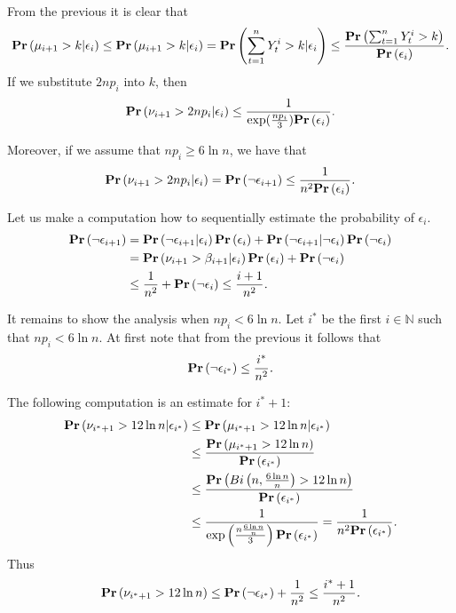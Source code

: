 From the previous it is clear that 
\[
\mathbf{Pr}\left(\mu_{i + 1} > k | \epsilon_i\right) \leq \mathbf{Pr}\left(\mu_{i + 1} > k | \epsilon_i\right) = \mathbf{Pr}\left(\displaystyle\sum_{t = 1}^{n} Y_t^{i} > k | \epsilon_i\right) \leq \frac{\mathbf{Pr}\left(\sum_{t = 1}^{n} Y_t^{i} > k\right)}{\mathbf{Pr}\left(\epsilon_i\right)}\textit{.}
\]
If we substitute $2np_i$ into $k$, then
\[
\mathbf{Pr}\left(\nu_{i + 1} > 2np_i | \epsilon_i\right) \leq \frac{1}{\exp(\frac{np_i}{3})\mathbf{Pr}\left(\epsilon_i\right)} \text{.}
\]

Moreover, if we assume that $np_i \geq 6 \ln n$, we have that 
\[
\mathbf{Pr}\left(\nu_{i + 1} > 2np_i | \epsilon_i\right) = \mathbf{Pr}\left(\neg \epsilon_{i + 1}\right) \leq \frac{1}{n ^ 2\mathbf{Pr}\left(\epsilon_i\right)} \textit{.}
\]

Let us make a computation how to sequentially estimate the probability of $\epsilon_i$.
\[
\begin{split}
\mathbf{Pr}\left(\neg \epsilon_{i + 1}\right) 
	& = \mathbf{Pr}\left(\neg \epsilon_{i + 1} | \epsilon_i\right)\mathbf{Pr}\left(\epsilon_i\right) + \mathbf{Pr}\left(\neg \epsilon_{i + 1} | \neg \epsilon_i\right)\mathbf{Pr}\left(\neg \epsilon_i\right) \\
	& = \mathbf{Pr}\left(\nu_{i + 1} > \beta_{i + 1} | \epsilon_i\right)\mathbf{Pr}\left(\epsilon_i\right) + \mathbf{Pr}\left(\neg \epsilon_i\right) \\
	& \leq \frac{1}{n ^ 2} + \mathbf{Pr}\left(\neg \epsilon_i\right) \leq \frac{i + 1}{n ^ 2} \textit{.}
\end{split} 
\]

It remains to show the analysis when $np_i < 6 \ln n$. Let $i^*$ be the first $i \in \mathbb{N}$ such that $np_i < 6\ln n$. 
At first note that from the previous it follows that 
\[
\mathbf{Pr}\left(\neg \epsilon_{i^*}\right) \leq \frac{i^*}{n ^ 2} \textit{.}
\]

The following computation is an estimate for $i^* + 1$:
\[
\begin{split}
\mathbf{Pr}\left(\nu_{i^* + 1} > 12 \ln n | \epsilon_{i^*}\right) 
	& \leq \mathbf{Pr}\left(\mu_{i^* + 1} > 12 \ln n | \epsilon_{i^*}\right) \\
	& \leq \frac{\mathbf{Pr}\left(\mu_{i^* + 1} > 12 \ln n\right)}{\mathbf{Pr}\left(\epsilon_{i^*}\right)} \\
	& \leq \frac{\mathbf{Pr}\left(Bi\left(n, \frac{6 \ln n}{n}\right) > 12 \ln n\right)}{\mathbf{Pr}\left(\epsilon_{i^*}\right)} \\
	& \leq \frac{1}{\exp\left(\frac{n\frac{6 \ln n}{n}}{3}\right)\mathbf{Pr}\left(\epsilon_{i^*}\right)} = \frac{1}{n ^ 2 \mathbf{Pr}\left(\epsilon_{i^*}\right)} \textit{.}
\end{split}
\]
Thus
\[
\mathbf{Pr}\left(\nu_{i^* + 1} > 12 \ln n\right) \leq \mathbf{Pr}\left(\neg \epsilon_{i^*}\right) + \frac{1}{n ^ 2} \leq \frac{i^* + 1}{n ^ 2} \textit{.}
\]

